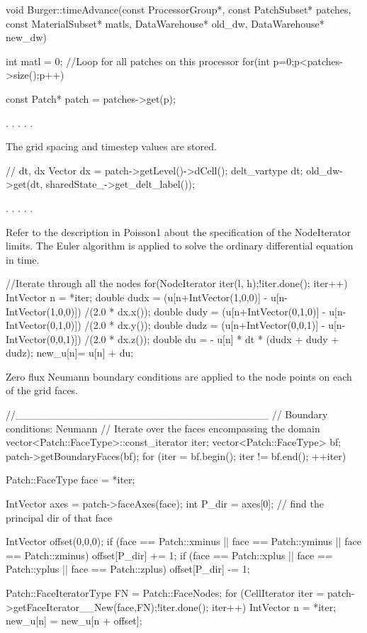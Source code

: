\documentclass[12pt]{report}
\begin{document}
void Burger::timeAdvance(const ProcessorGroup*,
                         const PatchSubset* patches,
                         const MaterialSubset* matls,
                         DataWarehouse* old_dw, 
                         DataWarehouse* new_dw)
{
  int matl = 0;
  //Loop for all patches on this processor
  for(int p=0;p<patches->size();p++){
    const Patch* patch = patches->get(p);
    
  . . . . .

The grid spacing and timestep values are stored.

    // dt, dx
    Vector dx = patch->getLevel()->dCell();
    delt_vartype dt;
    old_dw->get(dt, sharedState_->get_delt_label());
    
  . . . . .  

Refer to the description in Poisson1 about the specification of the NodeIterator limits.  The Euler algorithm is applied to solve the ordinary differential equation in time.

                   
    //Iterate through all the nodes
    for(NodeIterator iter(l, h);!iter.done(); iter++){    
      IntVector n = *iter;
      double dudx = (u[n+IntVector(1,0,0)] - u[n-IntVector(1,0,0)]) /(2.0 * dx.x());
      double dudy = (u[n+IntVector(0,1,0)] - u[n-IntVector(0,1,0)]) /(2.0 * dx.y());
      double dudz = (u[n+IntVector(0,0,1)] - u[n-IntVector(0,0,1)]) /(2.0 * dx.z());
      double du = - u[n] * dt * (dudx + dudy + dudz);
      new_u[n]= u[n] + du;
    }

Zero flux Neumann boundary conditions are applied to the node points on each of the grid faces.  

    //__________________________________
    // Boundary conditions: Neumann
    // Iterate over the faces encompassing the domain
    vector<Patch::FaceType>::const_iterator iter;
    vector<Patch::FaceType> bf;
    patch->getBoundaryFaces(bf);
    for (iter  = bf.begin(); iter != bf.end(); ++iter){
      Patch::FaceType face = *iter;

      IntVector axes = patch->faceAxes(face);
      int P_dir = axes[0]; // find the principal dir of that face

      IntVector offset(0,0,0);
      if (face == Patch::xminus || face == Patch::yminus || face == Patch::zminus){
        offset[P_dir] += 1; 
      }
      if (face == Patch::xplus || face == Patch::yplus || face == Patch::zplus){
        offset[P_dir] -= 1;
      }

      Patch::FaceIteratorType FN = Patch::FaceNodes;
      for (CellIterator iter = patch->getFaceIterator__New(face,FN);!iter.done(); iter++){
        IntVector n = *iter;
        new_u[n] = new_u[n + offset];
      }
    }
  }
}
\end{document}
